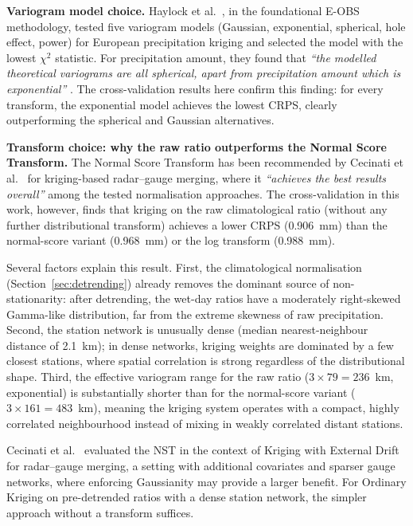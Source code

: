 \textbf{Variogram model choice.}
Haylock et al.~\cite[p.~5]{haylock2008european}, in the foundational
E-OBS methodology, tested five variogram models (Gaussian, exponential,
spherical, hole effect, power) for European precipitation kriging and
selected the model with the lowest $\chi^2$ statistic. For precipitation
amount, they found that \textit{``the modelled theoretical variograms are all
spherical, apart from precipitation amount which is exponential''}
\cite[p.~6]{haylock2008european}. The cross-validation results here
confirm this finding: for every transform, the exponential model
achieves the lowest CRPS, clearly outperforming the spherical and
Gaussian alternatives.

\textbf{Transform choice: why the raw ratio outperforms the Normal Score Transform.}
The Normal Score Transform has been recommended by Cecinati et
al.~\cite[p.~16]{cecinati2017} for kriging-based radar--gauge merging,
where it \textit{``achieves the best results overall''} among the tested
normalisation approaches. The cross-validation in this work, however,
finds that kriging on the raw climatological ratio (without any further
distributional transform) achieves a lower CRPS (0.906~mm) than the
normal-score variant (0.968~mm) or the log transform (0.988~mm).

Several factors explain this result. First, the climatological
normalisation (Section~\ref{sec:detrending}) already removes the
dominant source of non-stationarity: after detrending, the wet-day
ratios have a moderately right-skewed Gamma-like distribution, far from
the extreme skewness of raw precipitation. Second, the station network
is unusually dense (median nearest-neighbour distance of 2.1~km); in
dense networks, kriging weights are dominated by a few closest stations,
where spatial correlation is strong regardless of the distributional
shape. Third, the effective variogram range for the raw ratio
($3 \times 79 = 236$~km, exponential) is substantially shorter than for
the normal-score variant ($3 \times 161 = 483$~km), meaning the kriging
system operates with a compact, highly correlated neighbourhood instead
of mixing in weakly correlated distant stations.

Cecinati et al.~\cite{cecinati2017} evaluated the NST in the context of
Kriging with External Drift for radar--gauge merging, a setting with
additional covariates and sparser gauge networks, where enforcing
Gaussianity may provide a larger benefit. For Ordinary Kriging on
pre-detrended ratios with a dense station network, the simpler
approach without a transform suffices.

